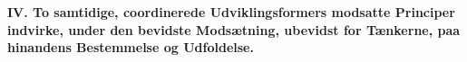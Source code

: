 \divrule

%
%
%
%
\begin{center}
\textbf{\large IV. To samtidige, coordinerede Udviklingsformers
modsatte Principer indvirke, under den bevidste
Modsætning, ubevidst for Tænkerne, paa hinandens
Bestemmelse og Udfoldelse.}
\end{center}

